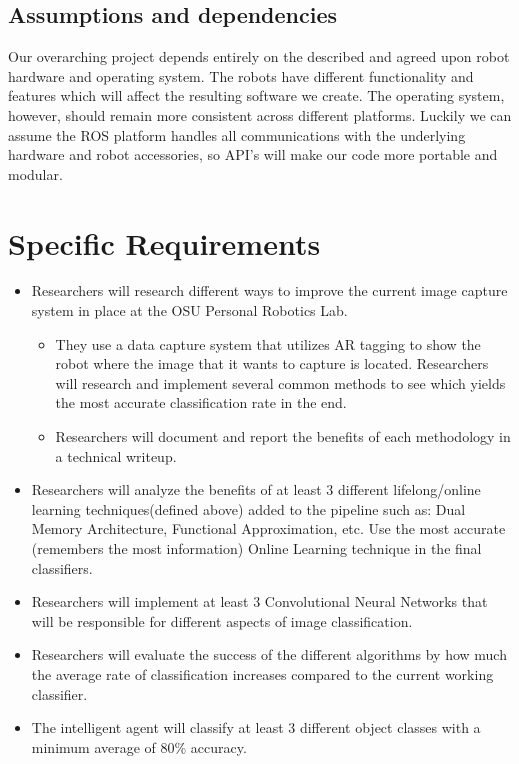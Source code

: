 \documentclass[draftclsnofoot, onecolumn, 10pt, compsoc]{IEEEtran}
\begin{document}
\subsection{Assumptions and dependencies}
Our overarching project depends entirely on the described and agreed upon robot hardware and operating system. The robots have different functionality and features which will affect the resulting software we create. The operating system, however, should remain more consistent across different platforms. Luckily we can assume the ROS platform handles all communications with the underlying hardware and robot accessories, so API's will make our code more portable and modular. 

\section{Specific Requirements}
\begin{itemize}
         \item Researchers will research different ways to improve the current image capture system in place at the OSU Personal Robotics Lab. 
         \begin{itemize}
         	\item They use a data capture system that utilizes AR tagging to show the robot where the image that it wants to capture is located. Researchers will research and implement several common methods to see which yields the most accurate classification rate in the end. 
            \item Researchers will document and report the benefits of each methodology in a technical writeup.
         \end{itemize}
         \item Researchers will analyze the benefits of at least 3 different lifelong/online learning techniques(defined above) added to the pipeline such as: Dual Memory Architecture, Functional Approximation, etc. Use the most accurate (remembers the most information) Online Learning technique in the final classifiers.
         \item Researchers will implement at least 3 Convolutional Neural Networks that will be responsible for different aspects of image classification. 
                  \item Researchers will evaluate the success of the different algorithms by how much the average rate of classification increases compared to the current working classifier.
         \item The intelligent agent will classify at least 3 different object classes with a minimum average of 80\% accuracy. 
\end{itemize} 	
  
\end{document}
